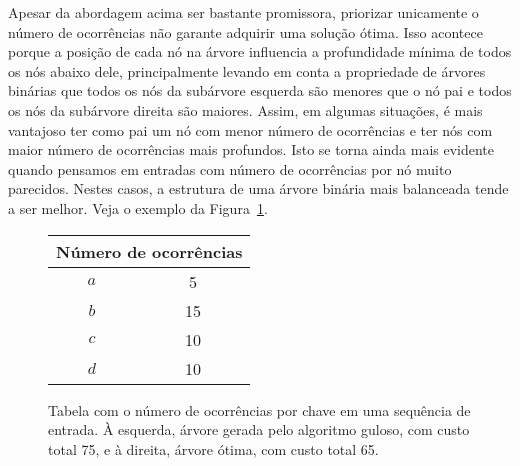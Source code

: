 Apesar da abordagem acima ser bastante promissora, priorizar unicamente o número de ocorrências não garante adquirir uma solução ótima. Isso acontece porque a posição de cada nó na árvore influencia a profundidade mínima de todos os nós abaixo dele, principalmente levando em conta a propriedade de árvores binárias que todos os nós da subárvore esquerda são menores que o nó pai e todos os nós da subárvore direita são maiores. Assim, em algumas situações, é mais vantajoso ter como pai um nó com menor número de ocorrências e ter nós com maior número de ocorrências mais profundos. Isto se torna ainda mais evidente quando pensamos em entradas com número de ocorrências por nó muito parecidos. Nestes casos, a estrutura de uma árvore binária mais balanceada tende a ser melhor. Veja o exemplo da Figura~\ref{fig:caso-guloso-subotimo}.


\begin{figure}[h]
\centering
\begin{minipage}[c]{0.35\textwidth}
  \centering
  \begin{tabular}{|c|c|}
  \hline
  \multicolumn{2}{|c|}{\textbf{Número de ocorrências}} \\
  \hline
  \textbf{$a$} & 5 \\
  $b$ & 15 \\
  $c$ & 10 \\
  $d$ & 10 \\
  \hline
  \end{tabular}
  \end{minipage}
\begin{minipage}[c]{0.3\textwidth}
\centering
{}
\end{minipage}
\begin{minipage}[c]{0.3\textwidth}
\centering
{}
\end{minipage}
\caption{Tabela com o número de ocorrências por chave em uma sequência de entrada. À esquerda, árvore gerada pelo algoritmo guloso, com custo total 75, e à direita, árvore ótima, com custo total 65.}
\label{fig:caso-guloso-subotimo}
\end{figure}

